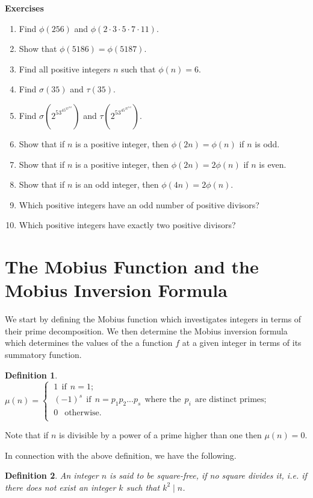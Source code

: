 \documentclass[12pt,letterpaper]{book}
\newtheorem{definition}{Definition}
\begin{document}
\textbf{Exercises}
\begin{enumerate}
\item{Find $\phi(256)$ and $\phi(2\cdot 3\cdot 5\cdot 7\cdot 11)$.} \item{Show that
$\phi(5186)=\phi(5187)$.}\item{Find all positive integers $n$ such
that $\phi(n)=6$.}\item{Find $\sigma(35)$ and $\tau(35)$.}
\item{Find $\sigma(2^53^45^37^313)$ and $\tau(2^53^45^37^313)$}.\item{Show that if $n$ is a positive integer, then
$\phi(2n)=\phi(n)$ if $n$ is odd.} \item{Show that if $n$ is a
positive integer, then $\phi(2n)=2\phi(n)$ if $n$ is
even.}\item{Show that if $n$ is an odd integer, then
$\phi(4n)=2\phi(n)$.}\item{Which positive integers have an
odd number of positive divisors?}\item{Which positive integers have
exactly two positive divisors?}
\end{enumerate}

\newpage

\section{The Mobius Function and the Mobius Inversion Formula}
We start by defining the Mobius function which investigates integers
in terms of their prime decomposition.  We then determine the Mobius
inversion formula which determines the values of the a function $f$
at a given integer in terms of its summatory function.

\begin{definition}
$\mu(n)=\left\{\begin{array}{lcr}
\ 1   \ \  \mbox{if}\ \  n=1;\\
\ (-1)^s  \ \  \mbox{if}\ \  n=p_1p_2...p_s \ \  \mbox{where the}\ \  p_i \ \   \mbox{are distinct primes};\\
\ 0   \ \  \mbox{ otherwise}.\\
\end{array}\right .\ $
\end{definition}

Note that if $n$ is divisible by a power of a prime higher than
one then $\mu(n)=0$.

In connection with the above definition, we have the following.
\begin{definition}
An integer $n$ is said to be square-free, if no square divides it, i.e. if there does not exist an integer $k$
such that $k^2\mid n$.
\end{definition}
\end{document}
